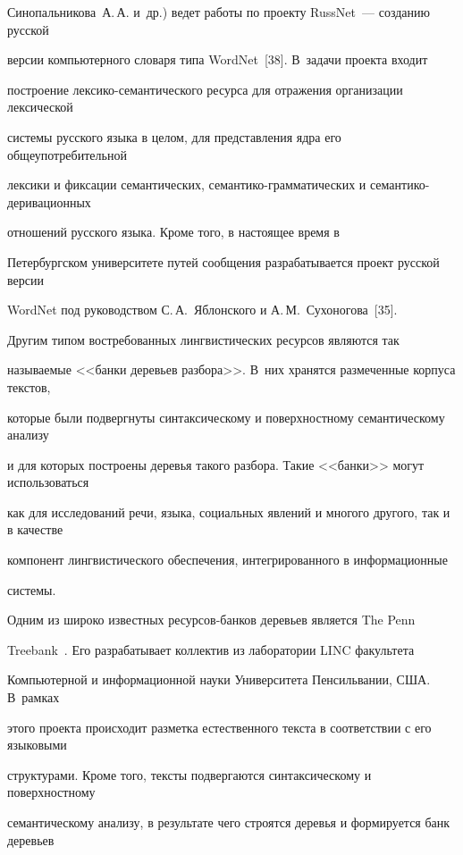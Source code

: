 Синопальникова~А.\,А. и~др.) ведет работы по проекту RussNet~--- созданию русской 


версии компьютерного словаря типа WordNet~[38]. В~задачи проекта входит 


построение лексико-семантического ресурса для отражения организации лексической 


системы русского языка в целом, для представления ядра его общеупотребительной 


лексики и фиксации семантических, семантико-грамматических и семантико-деривационных 


отношений русского языка. Кроме того, в настоящее время в 


Петербургском университете путей сообщения разрабатывается проект русской версии 


WordNet под руководством С.\,А.~Яблонского и А.\,М.~Сухоногова~[35]. 


      


      Другим типом востребованных лингвистических ресурсов являются так 


называемые <<банки деревьев разбора>>. В~них хранятся размеченные корпуса текстов, 


которые были подвергнуты синтаксическому и поверхностному семантическому анализу 


и для которых построены деревья такого разбора. Такие <<банки>> могут использоваться 


как для исследований речи, языка, социальных явлений и многого другого, так и в качестве 


компонент лингвистического обеспечения, интегрированного в информационные 


системы. 


      


      Одним из широко известных ресурсов-банков деревьев является The Penn 


Treebank~\cite{39-2-11}. Его разрабатывает коллектив из лаборатории LINC факультета 


Компьютерной и информационной науки Университета Пенсильвании, США. В~рамках 


этого проекта происходит разметка естественного текста в соответствии с его языковыми 


структурами. Кроме того, тексты подвергаются синтаксическому и поверхностному 


семантическому анализу, в результате чего строятся деревья и формируется банк деревьев 


